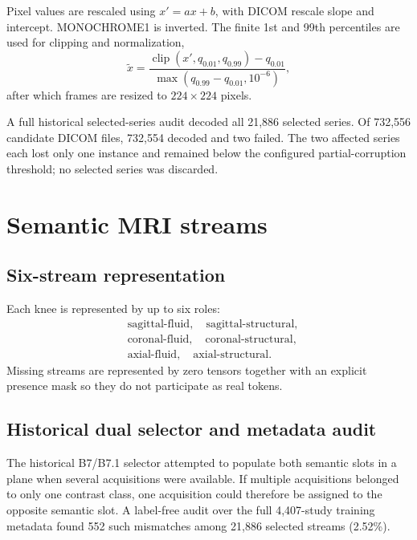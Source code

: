 \documentclass[preprint,12pt]{elsarticle}
\begin{document}
Pixel values are rescaled using $x'=ax+b$, with DICOM rescale slope and intercept. MONOCHROME1 is inverted. The finite 1st and 99th percentiles are used for clipping and normalization,
\begin{equation}
\tilde{x}=\frac{\operatorname{clip}(x',q_{0.01},q_{0.99})-q_{0.01}}
{\max(q_{0.99}-q_{0.01},10^{-6})},
\end{equation}
after which frames are resized to $224\times224$ pixels.

A full historical selected-series audit decoded all 21,886 selected series. Of 732,556 candidate DICOM files, 732,554 decoded and two failed. The two affected series each lost only one instance and remained below the configured partial-corruption threshold; no selected series was discarded.

\section{Semantic MRI streams}
\label{sec:routing}

\subsection{Six-stream representation}
Each knee is represented by up to six roles:
\begin{align*}
&\text{sagittal-fluid},\quad \text{sagittal-structural},\\
&\text{coronal-fluid},\quad \text{coronal-structural},\\
&\text{axial-fluid},\quad \text{axial-structural}.
\end{align*}
Missing streams are represented by zero tensors together with an explicit presence mask so they do not participate as real tokens.

\subsection{Historical dual selector and metadata audit}
The historical B7/B7.1 selector attempted to populate both semantic slots in a plane when several acquisitions were available. If multiple acquisitions belonged to only one contrast class, one acquisition could therefore be assigned to the opposite semantic slot. A label-free audit over the full 4,407-study training metadata found 552 such mismatches among 21,886 selected streams (2.52\%).
\end{document}
